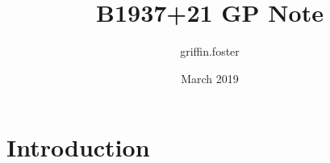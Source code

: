 \documentclass{article}
\title{B1937+21 GP Note}
\author{griffin.foster }
\date{March 2019}
\begin{document}
\maketitle

\section{Introduction}
\end{document}
